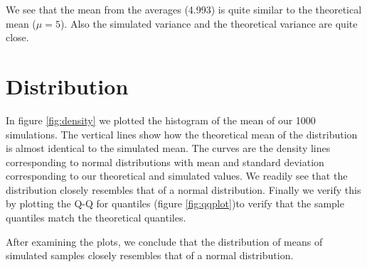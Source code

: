 \documentclass{article}\usepackage[]{graphicx}\usepackage[]{color}
\begin{document}
We see that the mean from the averages (4.993) is quite similar to the theoretical mean ($\mu=5$). Also the simulated variance and the theoretical variance are quite close.

\section{Distribution}

In figure \ref{fig:density} we plotted the histogram of the mean of our 1000 simulations. The vertical lines show how the theoretical mean of the distribution is almost identical to the simulated mean. The curves are the density lines corresponding to normal distributions with mean and standard deviation corresponding to our theoretical and simulated values. We readily see that the distribution closely resembles that of a normal distribution. Finally we verify this by plotting the Q-Q for quantiles (figure \ref{fig:qqplot})to verify that the sample quantiles match the theoretical quantiles.

After examining the plots, we conclude that the distribution of means of simulated samples closely resembles that of a normal distribution.
\end{document}
